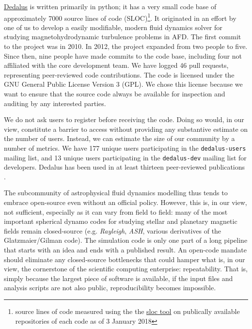 \documentclass[12pt, preprint]{aastex}
\newcommand{\dedalus}{\href{http://dedalus-project.org}{Dedalus}}
\begin{document}
\dedalus{} is written primarily in python; it has a very small code base of approximately 7000 source lines of code (SLOC)\footnote{source lines of code measured using the the \href{https://github.com/bytbox/sloc}{sloc tool} on publically available repositories of each code as of 3 January 2018}. It originated in an effort by one of us to develop a easily modifiable, modern fluid dynamics solver for studying magnetohydrodynamic turbulence problems in AFD. The first commit to the project was in 2010. In 2012, the project expanded from two people to five. Since then, nine people have made commits to the code base, including four not affiliated with the core development team. We have logged 46 pull requests, representing peer-reviewed code contributions. The code is licensed under the GNU General Public License Version 3 (GPL). We chose this license because we want to ensure that the source code always be available for inspection and auditing by any interested parties. 

We do not ask users to register before receiving the code. Doing so would, in our view, constitute a barrier to access without providing any substantive estimate on the number of users. Instead, we can estimate the size of our community by a number of metrics. We have 177 unique users participating in the \texttt{dedalus-users} mailing list, and 13 unique users participating in the \texttt{dedalus-dev} mailing list for developers. Dedalus has been used in at least thirteen peer-reviewed publications \citep{2017PhRvF...2h3501A,PhysRevFluids.2.094804,2017ApJ...841....1C,2017ApJ...841....2C,2017MNRAS.466.2181L,2016ApJ...832...71L,2016JCoPh.325...53V,2016PhRvE..94e3206D,2016PhRvL.116j5004D,2016MNRAS.455.4274L,2015PhRvE..91f3016L,2014ApJ...797...94L}.

The subcommunity of astrophysical fluid dynamics modelling thus tends to embrace open-source even without an official policy. However, this is, in our view, not sufficient, especially as it can vary from field to field: many of the most important spherical dynamo codes for studying stellar and planetary magnetic fields remain closed-source (e.g. \emph{Rayleigh}, \emph{ASH}, various derivatives of the Glatzmaier/Gilman code). The simulation code is only one part of a long pipeline that starts with an idea and ends with a published result. An open-code mandate should eliminate any closed-source bottlenecks that could hamper what is, in our view, the cornerstone of the scientific computing enterprise: repeatability. That is, simply because the largest piece of software is available, if the input files and analysis scripts are not also public, reproducibility becomes impossible. 
\end{document}
